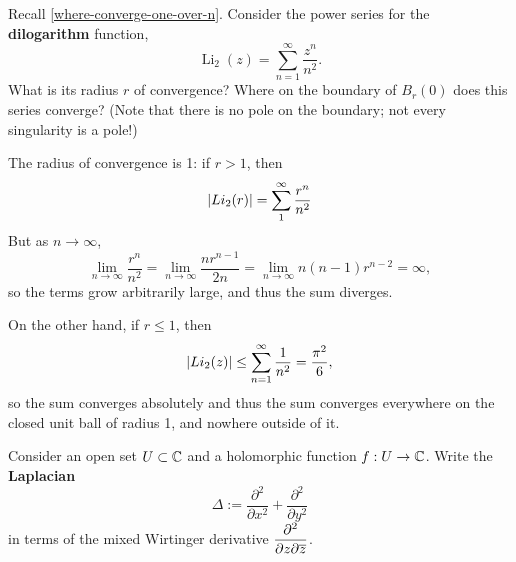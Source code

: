 \documentclass{homework}
\DeclareMathOperator{\polylog}{Li}
\newcommand{\dilog}{\polylog_2}
\begin{document}
                \begin{problem}
                  Recall \ref{where-converge-one-over-n}.  Consider the power series for the \textbf{dilogarithm} function,
                    \[
                        \dilog(z) = \sum_{n=1}^\infty \frac{z^n}{n^2}.
                          \]
                            What is its radius $r$ of convergence?  Where on the boundary of
                              $B_r(0)$ does this series converge?  (Note that there is no pole on
                                the boundary; not every singularity is a pole!)
                                \end{problem}
                                \begin{solution}
                                The radius of convergence is 1: if $r > 1$, then  
                                \[\left|Li_2(r)\right| = \sum_1^\infty \frac{r^n}{n^2}\]
                                But as $n\to\infty$, 
                                \[
                                \lim_{n\to \infty} \frac{r^n}{n^2} = \lim_{n\to \infty} \frac{nr^{n-1}}{2n} =  \lim_{n\to \infty} n(n-1)r^{n-2} = \infty,
                                \]
                                so the terms grow arbitrarily large, and thus the sum diverges.

                                On the other hand, if $r\leq 1$, then 
                                \[\left|Li_2(z)\right| \leq \sum_{n=1}^\infty \frac{1}{n^2} = \frac{\pi^2}{6},\]
                                so the sum converges absolutely and thus the sum converges everywhere on the closed unit ball of radius 1, and nowhere outside of it.
                                \end{solution}
                                \begin{problem}\label{laplacian-via-wirtinger}Consider an open set
                                  $U \subset \mathbb{C}$ and a holomorphic function $f : U \to \mathbb{C}$.  Write
                                    the \textbf{Laplacian}
                                      \[
                                          \Delta := \frac{\partial^2}{\partial x^2} + \frac{\partial^2}{\partial y^2} 
                                            \]
                                              in terms of the mixed Wirtinger derivative
                                                $\displaystyle\frac{\partial^2}{\partial z \partial \overline{z}}$.
                                                \end{problem}
\end{document}
